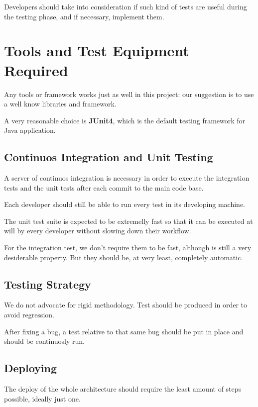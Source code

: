 \documentclass[11pt]{article} %
\begin{document}
Developers should take into consideration if such kind of tests are useful during the testing phase, and if necessary, implement them.



\newpage
\section{Tools and Test Equipment Required}

Any tools or framework works just as well in this project: our suggestion is to use a well know libraries and framework.

A very reasonable choice is \textbf{JUnit4}, which is the default testing framework for Java application.

\subsection{Continuos Integration and Unit Testing}

A server of continuos integration is necessary in order to execute the integration tests and the unit tests after each commit to the main code base.

Each developer should still be able to run every test in its developing machine.

The unit test suite is expected to be extremelly fast so that it can be executed at will by every developer without slowing down their workflow.

For the integration test, we don't require them to be fast, although is still a very desiderable property. But they should be, at very least, completely automatic.

\subsection{Testing Strategy}

We do not advocate for rigid methodology. Test should be produced in order to avoid regression. 

After fixing a bug, a test relative to that same bug should be put in place and should be continuosly run.

\subsection{Deploying}

The deploy of the whole architecture should require the least amount of steps possible, ideally just one.
\end{document}
